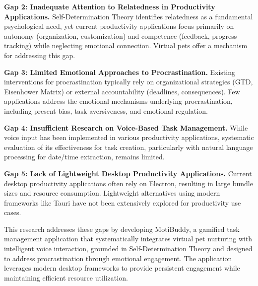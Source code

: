 \textbf{Gap 2: Inadequate Attention to Relatedness in Productivity Applications.} Self-Determination Theory identifies relatedness as a fundamental psychological need, yet current productivity applications focus primarily on autonomy (organization, customization) and competence (feedback, progress tracking) while neglecting emotional connection. Virtual pets offer a mechanism for addressing this gap.

\textbf{Gap 3: Limited Emotional Approaches to Procrastination.} Existing interventions for procrastination typically rely on organizational strategies (GTD, Eisenhower Matrix) or external accountability (deadlines, consequences). Few applications address the emotional mechanisms underlying procrastination, including present bias, task aversiveness, and emotional regulation.

\textbf{Gap 4: Insufficient Research on Voice-Based Task Management.} While voice input has been implemented in various productivity applications, systematic evaluation of its effectiveness for task creation, particularly with natural language processing for date/time extraction, remains limited.

\textbf{Gap 5: Lack of Lightweight Desktop Productivity Applications.} Current desktop productivity applications often rely on Electron, resulting in large bundle sizes and resource consumption. Lightweight alternatives using modern frameworks like Tauri have not been extensively explored for productivity use cases.

This research addresses these gaps by developing MotiBuddy, a gamified task management application that systematically integrates virtual pet nurturing with intelligent voice interaction, grounded in Self-Determination Theory and designed to address procrastination through emotional engagement. The application leverages modern desktop frameworks to provide persistent engagement while maintaining efficient resource utilization.

